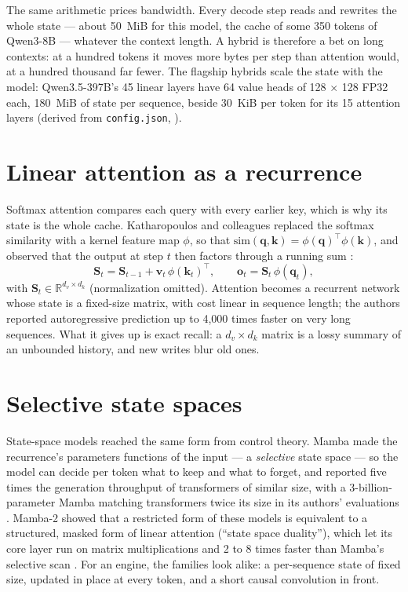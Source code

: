 The same arithmetic prices bandwidth. Every decode step reads and rewrites the
whole state --- about 50~MiB for this model, the cache of some 350 tokens of
Qwen3-8B --- whatever the context length. A hybrid is therefore a bet on long
contexts: at a hundred tokens it moves more bytes per step than attention
would, at a hundred thousand far fewer. The flagship hybrids scale the state
with the model: Qwen3.5-397B's 45 linear layers have 64 value heads of
128 $\times$ 128 FP32 each, 180~MiB of state per sequence, beside 30~KiB per
token for its 15 attention layers (derived from \texttt{config.json},
\cite{qwen2026qwen35config}).

\section{Linear attention as a recurrence}

Softmax attention compares each query with every earlier key, which is why its
state is the whole cache. Katharopoulos and colleagues replaced the softmax
similarity with a kernel feature map $\phi$, so that
$\mathrm{sim}(\mathbf{q},\mathbf{k}) = \phi(\mathbf{q})^{\top}\phi(\mathbf{k})$,
and observed that the output at step $t$ then factors through a running sum
\cite{katharopoulos2020lineartransformers}:
\begin{equation}
\mathbf{S}_t = \mathbf{S}_{t-1} + \mathbf{v}_t\,\phi(\mathbf{k}_t)^{\top},
\qquad
\mathbf{o}_t = \mathbf{S}_t\,\phi(\mathbf{q}_t),
\label{eq:linear-attention}
\end{equation}
with $\mathbf{S}_t \in \mathbb{R}^{d_v \times d_k}$ (normalization omitted).
Attention becomes a recurrent network whose state is a fixed-size matrix, with
cost linear in sequence length; the authors reported autoregressive prediction
up to 4,000 times faster on very long sequences. What it gives up is exact
recall: a $d_v \times d_k$ matrix is a lossy summary of an unbounded history,
and new writes blur old ones.

\section{Selective state spaces}

State-space models reached the same form from control theory. Mamba made the
recurrence's parameters functions of the input --- a \emph{selective} state
space --- so the model can decide per token what to keep and what to forget,
and reported five times the generation throughput of transformers of similar
size, with a 3-billion-parameter Mamba matching transformers twice its size in
its authors' evaluations \cite{gu2023mamba}. Mamba-2 showed that a restricted
form of these models is equivalent to a structured, masked form of linear
attention (``state space duality''), which let its core layer run on matrix
multiplications and 2 to 8 times faster than Mamba's selective scan
\cite{dao2024mamba2}. For an engine, the families look alike: a per-sequence
state of fixed size, updated in place at every token, and a short causal
convolution in front.

